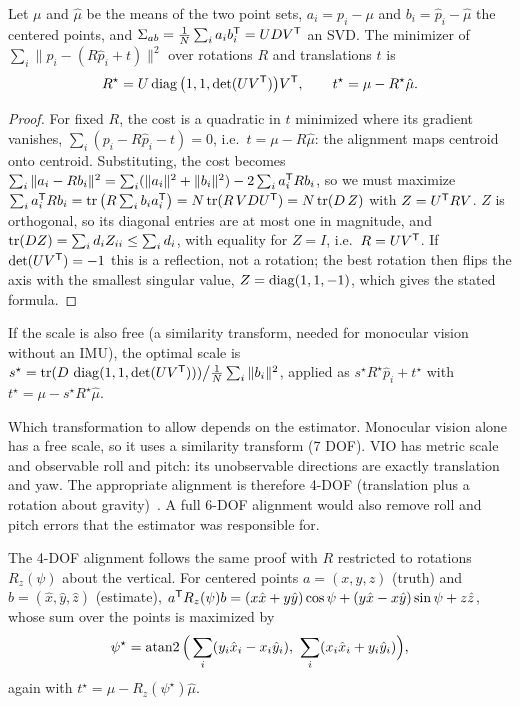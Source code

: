 \begin{proposition}
\label{prop:umeyama}\label{sec:umeyama}
Let $\mu$ and $\hat\mu$ be the means of the two point sets, $a_i = p_i - \mu$ and $b_i = \hat p_i - \hat\mu$ the centered points, and
$\Sigma_{ab} = \frac1N\sum_ia_ib_i^{\mathsf{T}} = UDV^{\mathsf{T}}$ an SVD. The minimizer of $\sum_i\|p_i - (R\hat p_i + t)\|^2$ over rotations $R$ and translations $t$ is
\begin{equation}
  R^\star = U\operatorname{diag}\big(1, 1, \det(UV^{\mathsf{T}})\big)V^{\mathsf{T}}, \qquad t^\star = \mu - R^\star\hat\mu .
\end{equation}
\end{proposition}
\begin{proof}
For fixed $R$, the cost is a quadratic in $t$ minimized where its gradient vanishes, $\sum_i(p_i - R\hat p_i - t) = 0$, i.e.\ $t = \mu - R\hat\mu$: the alignment maps
centroid onto centroid. Substituting, the cost becomes $\sum_i\|a_i - Rb_i\|^2 = \sum_i(\|a_i\|^2 + \|b_i\|^2) - 2\sum_ia_i^{\mathsf{T}} Rb_i$, so we must maximize
$\sum_ia_i^{\mathsf{T}} Rb_i = \operatorname{tr}\big(R\sum_ib_ia_i^{\mathsf{T}}\big) = N\operatorname{tr}(R\,VDU^{\mathsf{T}}) = N\operatorname{tr}(D\,Z)$ with $Z = U^{\mathsf{T}} RV$. $Z$ is orthogonal, so its diagonal entries are at most one in
magnitude, and $\operatorname{tr}(DZ) = \sum_id_iZ_{ii} \le \sum_id_i$, with equality for $Z = I$, i.e.\ $R = UV^{\mathsf{T}}$. If $\det(UV^{\mathsf{T}}) = -1$ this is a reflection, not a rotation; the
best rotation then flips the axis with the smallest singular value, $Z = \operatorname{diag}(1, 1, -1)$, which gives the stated formula.
\end{proof}

If the scale is also free (a similarity transform, needed for monocular vision without an IMU), the optimal scale is
$s^\star = \operatorname{tr}(D\,\operatorname{diag}(1, 1, \det(UV^{\mathsf{T}})))\big/\frac1N\sum_i\|b_i\|^2$, applied as $s^\star R^\star\hat p_i + t^\star$ with $t^\star = \mu - s^\star R^\star\hat\mu$.

\begin{keyidea}
Which transformation to allow depends on the estimator. Monocular vision alone has a free scale, so it uses a
similarity transform (7 DOF). VIO has metric scale and observable roll and pitch: its unobservable directions are
exactly translation and yaw. The appropriate alignment is therefore 4-DOF (translation plus a rotation about
gravity)~\cite{zhang2018tutorial}. A full 6-DOF alignment would also remove roll and pitch errors that the
estimator was responsible for.
\end{keyidea}

The 4-DOF alignment follows the same proof with $R$ restricted to rotations $R_z(\psi)$ about the vertical. For centered points $a = (x, y, z)$ (truth)
and $b = (\hat x, \hat y, \hat z)$ (estimate), $a^{\mathsf{T}} R_z(\psi)b = (x\hat x + y\hat y)\cos\psi + (y\hat x - x\hat y)\sin\psi + z\hat z$, whose sum over the points is maximized by
\begin{equation}
  \psi^\star = \operatorname{atan2}\Big(\sum_i(y_i\hat x_i - x_i\hat y_i),\ \sum_i(x_i\hat x_i + y_i\hat y_i)\Big),
  \label{eq:4dof-yaw}
\end{equation}
again with $t^\star = \mu - R_z(\psi^\star)\hat\mu$.

